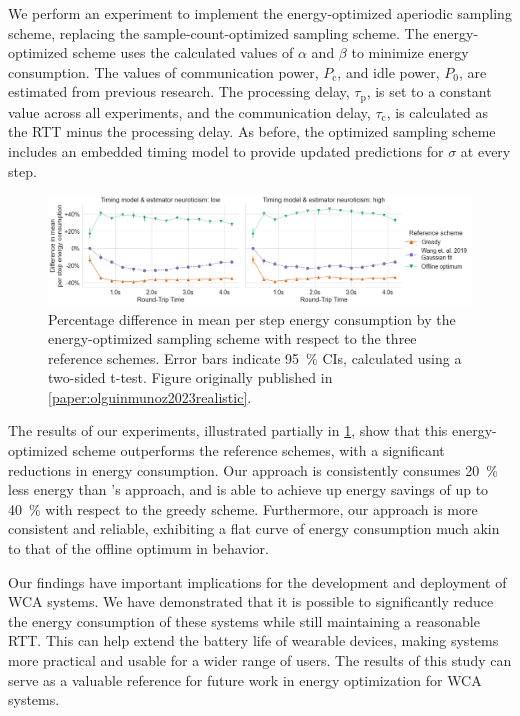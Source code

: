 We perform an experiment to implement the energy-optimized aperiodic sampling scheme, replacing the sample-count-optimized sampling scheme.
The energy-optimized scheme uses the calculated values of \ensuremath{\alpha} and \ensuremath{\beta} to minimize energy consumption.
The values of communication power, \ensuremath{P_{\text{c}}}, and idle power, \ensuremath{P_0}, are estimated from previous research.
The processing delay, \ensuremath{\tau_{\text{p}}}, is set to a constant value across all experiments, and the communication delay, \ensuremath{\tau_{\text{c}}}, is calculated as the \gls{RTT} minus the processing delay.
As before, the optimized sampling scheme includes an embedded timing model to provide updated predictions for \ensuremath{\sigma} at every step.

\begin{figure}
    \centering
    \includegraphics[width=\textwidth]{publications/2023EdgeDroid2/figs/new_model/energy_optimization_diff}
    \caption{%
        Percentage difference in mean per step energy consumption by the energy-optimized sampling scheme with respect to the three reference schemes.
        Error bars indicate \SI{95}{\percent} \glspl{CI}, calculated using a two-sided t-test.
        Figure originally published in \cref{paper:olguinmunoz2023realistic}.
    }\label{fig:energyresults}
\end{figure}

The results of our experiments, illustrated partially in \cref{fig:energyresults}, show that this energy-optimized scheme outperforms the reference schemes, with a significant reductions in energy consumption.
Our approach is consistently consumes \SI{20}{\percent} less energy than \textcite{wang2019towards}'s approach, and is able to achieve up energy savings of up to \SI{40}{\percent} with respect to the greedy scheme.
Furthermore, our approach is more consistent and reliable, exhibiting a flat curve of energy consumption much akin to that of the offline optimum in behavior.

Our findings have important implications for the development and deployment of \gls{WCA} systems.
We have demonstrated that it is possible to significantly reduce the energy consumption of these systems while still maintaining a reasonable \gls{RTT}.
This can help extend the battery life of wearable devices, making  systems more practical and usable for a wider range of users.
The results of this study can serve as a valuable reference for future work in energy optimization for \acl{WCA} systems.

